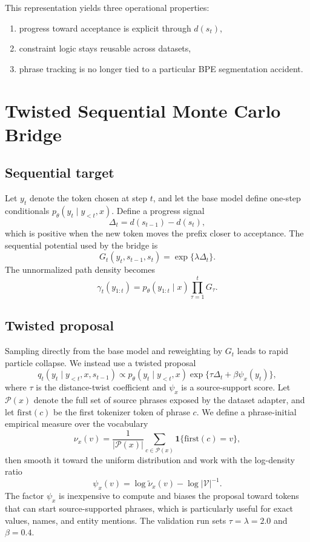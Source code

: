 \documentclass[11pt]{article}
\begin{document}
This representation yields three operational properties:
\begin{enumerate}[leftmargin=1.5em]
  \item progress toward acceptance is explicit through $d(s_t)$,
  \item constraint logic stays reusable across datasets,
  \item phrase tracking is no longer tied to a particular BPE segmentation accident.
\end{enumerate}

\section{Twisted Sequential Monte Carlo Bridge}
\subsection{Sequential target}
Let $y_t$ denote the token chosen at step $t$, and let the base model define one-step conditionals $p_\theta(y_t\mid y_{<t},x)$. Define a progress signal
\[
\Delta_t = d(s_{t-1}) - d(s_t),
\]
which is positive when the new token moves the prefix closer to acceptance. The sequential potential used by the bridge is
\[
G_t(y_t,s_{t-1},s_t) = \exp\{\lambda \Delta_t\}.
\]
The unnormalized path density becomes
\[
\gamma_t(y_{1:t}) = p_\theta(y_{1:t}\mid x)\prod_{\tau=1}^{t}G_\tau.
\]

\subsection{Twisted proposal}
Sampling directly from the base model and reweighting by $G_t$ leads to rapid particle collapse. We instead use a twisted proposal
\[
q_t(y_t\mid y_{<t},x,s_{t-1})
\propto
p_\theta(y_t\mid y_{<t},x)\exp\{\tau \Delta_t + \beta \psi_x(y_t)\},
\]
where $\tau$ is the distance-twist coefficient and $\psi_x$ is a source-support score. Let $\mathcal{P}(x)$ denote the full set of source phrases exposed by the dataset adapter, and let $\mathrm{first}(c)$ be the first tokenizer token of phrase $c$. We define a phrase-initial empirical measure over the vocabulary
\[
\nu_x(v)
=
\frac{1}{|\mathcal{P}(x)|}
\sum_{c \in \mathcal{P}(x)}
\mathbf{1}\{\mathrm{first}(c)=v\},
\]
then smooth it toward the uniform distribution and work with the log-density ratio
\[
\psi_x(v)
=
\log \widetilde{\nu}_x(v) - \log |\mathcal{V}|^{-1}.
\]
The factor $\psi_x$ is inexpensive to compute and biases the proposal toward tokens that can start source-supported phrases, which is particularly useful for exact values, names, and entity mentions. The validation run sets $\tau=\lambda=2.0$ and $\beta=0.4$.
\end{document}
